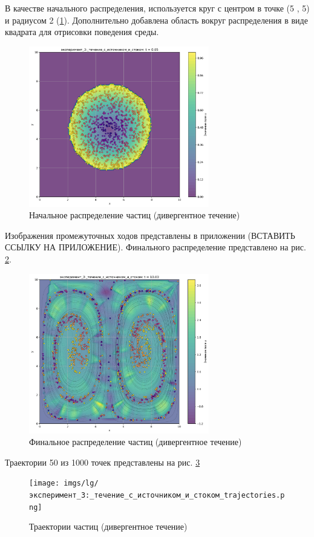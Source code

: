 В качестве начального распределения, используется круг с центром в точке (5 , 5) и радиусом 2 (\ref{fig:lg_div_begin}). Дополнительно добавлена область вокруг распределения в виде квадрата для отрисовки поведения среды.
\begin{figure}
	\centering
	\includegraphics[width=0.7\textwidth]{imgs/lg/эксперимент_3:_течение_с_источником_и_стоком_t0.05.png}
	\caption{Начальное распределение частиц (дивергентное течение)}
	\label{fig:lg_div_begin}
\end{figure}

Изображения промежуточных ходов представлены в приложении (ВСТАВИТЬ ССЫЛКУ НА ПРИЛОЖЕНИЕ).
Финального распределение представлено на рис. \ref{fig:lg_div_finall}.
\begin{figure}
	\centering
	\includegraphics[width=0.7\textwidth]{imgs/lg/эксперимент_3:_течение_с_источником_и_стоком_t10.00.png}
	\caption{Финальное распределение частиц (дивергентное течение)}
	\label{fig:lg_div_finall}
\end{figure}
Траектории 50 из 1000 точек представлены на рис. \ref{fig:lg_div_tr}
\begin{figure}
	\centering
	\texttt{[image: imgs/lg/эксперимент\_3:\_течение\_с\_источником\_и\_стоком\_trajectories.png]}
	\caption{Траектории частиц (дивергентное течение)}
	\label{fig:lg_div_tr}
\end{figure}

